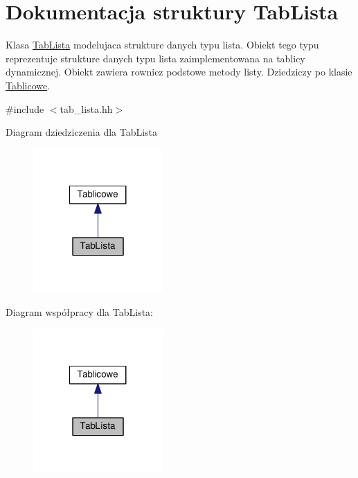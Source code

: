 \hypertarget{struct_tab_lista}{\section{Dokumentacja struktury Tab\-Lista}
\label{struct_tab_lista}
}


Klasa \hyperlink{struct_tab_lista}{Tab\-Lista} modelujaca strukture danych typu lista. Obiekt tego typu reprezentuje strukture danych typu lista zaimplementowana na tablicy dynamicznej. Obiekt zawiera rowniez podstowe metody listy. Dziedziczy po klasie \hyperlink{class_tablicowe}{Tablicowe}.  




{\ttfamily \#include $<$tab\-\_\-lista.\-hh$>$}



Diagram dziedziczenia dla Tab\-Lista
\nopagebreak
\begin{figure}[H]
\begin{center}
\leavevmode
\includegraphics[width=140pt]{struct_tab_lista__inherit__graph}
\end{center}
\end{figure}


Diagram współpracy dla Tab\-Lista\-:
\nopagebreak
\begin{figure}[H]
\begin{center}
\leavevmode
\includegraphics[width=140pt]{struct_tab_lista__coll__graph}
\end{center}
\end{figure}
